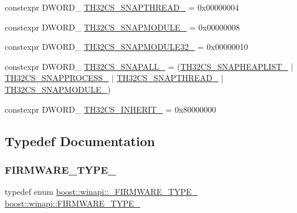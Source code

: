 \begin{DoxyCompactItemize}
\item 
constexpr D\+W\+O\+R\+D\+\_\+ \mbox{\hyperlink{namespaceboost_1_1winapi_a7184f54ffa0968500fb1210f88d291d4}{T\+H32\+C\+S\+\_\+\+S\+N\+A\+P\+T\+H\+R\+E\+A\+D\+\_\+}} = 0x00000004
\item 
constexpr D\+W\+O\+R\+D\+\_\+ \mbox{\hyperlink{namespaceboost_1_1winapi_ab48e0b7e2c6970a756061d892af37ed5}{T\+H32\+C\+S\+\_\+\+S\+N\+A\+P\+M\+O\+D\+U\+L\+E\+\_\+}} = 0x00000008
\item 
constexpr D\+W\+O\+R\+D\+\_\+ \mbox{\hyperlink{namespaceboost_1_1winapi_aad672eecd7bed7339a10bf2262444793}{T\+H32\+C\+S\+\_\+\+S\+N\+A\+P\+M\+O\+D\+U\+L\+E32\+\_\+}} = 0x00000010
\item 
constexpr D\+W\+O\+R\+D\+\_\+ \mbox{\hyperlink{namespaceboost_1_1winapi_a5b0509691fd3f564bb6293867a864e2a}{T\+H32\+C\+S\+\_\+\+S\+N\+A\+P\+A\+L\+L\+\_\+}} = (\mbox{\hyperlink{namespaceboost_1_1winapi_af77c6a7f30e9b6ca9df6d4b8b1f449ba}{T\+H32\+C\+S\+\_\+\+S\+N\+A\+P\+H\+E\+A\+P\+L\+I\+S\+T\+\_\+}} $\vert$ \mbox{\hyperlink{namespaceboost_1_1winapi_a09b08eb6e34c75ab2914c7b1284739d4}{T\+H32\+C\+S\+\_\+\+S\+N\+A\+P\+P\+R\+O\+C\+E\+S\+S\+\_\+}} $\vert$ \mbox{\hyperlink{namespaceboost_1_1winapi_a7184f54ffa0968500fb1210f88d291d4}{T\+H32\+C\+S\+\_\+\+S\+N\+A\+P\+T\+H\+R\+E\+A\+D\+\_\+}} $\vert$ \mbox{\hyperlink{namespaceboost_1_1winapi_ab48e0b7e2c6970a756061d892af37ed5}{T\+H32\+C\+S\+\_\+\+S\+N\+A\+P\+M\+O\+D\+U\+L\+E\+\_\+}})
\item 
constexpr D\+W\+O\+R\+D\+\_\+ \mbox{\hyperlink{namespaceboost_1_1winapi_ac4d273b2bd8cd691547b10b5f1a39142}{T\+H32\+C\+S\+\_\+\+I\+N\+H\+E\+R\+I\+T\+\_\+}} = 0x80000000
\end{DoxyCompactItemize}


\subsection{Typedef Documentation}
\mbox{\label{namespaceboost_1_1winapi_ab2bb3265a50b62bf9ddb48517baf2b10}} 
\subsubsection{\texorpdfstring{F\+I\+R\+M\+W\+A\+R\+E\+\_\+\+T\+Y\+P\+E\+\_\+}{FIRMWARE\_TYPE\_}}
{\footnotesize\ttfamily typedef enum \mbox{\hyperlink{namespaceboost_1_1winapi_a95c858e6ecc52cd337e0e5e8ef33841d}{boost\+::winapi\+::\+\_\+\+F\+I\+R\+M\+W\+A\+R\+E\+\_\+\+T\+Y\+P\+E\+\_\+}}  \mbox{\hyperlink{namespaceboost_1_1winapi_ab2bb3265a50b62bf9ddb48517baf2b10}{boost\+::winapi\+::\+F\+I\+R\+M\+W\+A\+R\+E\+\_\+\+T\+Y\+P\+E\+\_\+}}}

